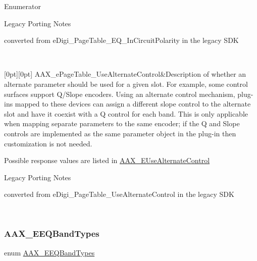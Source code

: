 \begin{DoxyEnumFields}{Enumerator}
\begin{DoxyRefDesc}{Legacy Porting Notes}
\item[\mbox{\hyperlink{a00787__porting_notes000025}{Legacy Porting Notes}}]converted from {\ttfamily e\+Digi\+\_\+\+Page\+Table\+\_\+\+E\+Q\+\_\+\+In\+Circuit\+Polarity} in the legacy S\+DK\end{DoxyRefDesc}
\\
\hline

[0pt][0pt]{}\mbox{\label{a00491_aa169208a2ce713fa021e20deb2eaf608a1a0d975a333d3aee81b22f878697e9c4}} 
A\+A\+X\+\_\+e\+Page\+Table\+\_\+\+Use\+Alternate\+Control&Description of whether an alternate parameter should be used for a given slot. For example, some control surfaces support Q/\+Slope encoders. Using an alternate control mechanism, plug-\/ins mapped to these devices can assign a different slope control to the alternate slot and have it coexist with a Q control for each band. This is only applicable when mapping separate parameters to the same encoder; if the Q and Slope controls are implemented as the same parameter object in the plug-\/in then customization is not needed.

Possible response values are listed in \mbox{\hyperlink{a00491_abbcc8b4e8207262a5dd9e32047a51a29}{A\+A\+X\+\_\+\+E\+Use\+Alternate\+Control}}

\begin{DoxyRefDesc}{Legacy Porting Notes}
\item[\mbox{\hyperlink{a00787__porting_notes000026}{Legacy Porting Notes}}]converted from {\ttfamily e\+Digi\+\_\+\+Page\+Table\+\_\+\+Use\+Alternate\+Control} in the legacy S\+DK\end{DoxyRefDesc}
\\
\hline

\end{DoxyEnumFields}
\mbox{\label{a00491_a9ec6da28e827496514bd15d6f2b26d95}} 
\subsubsection{\texorpdfstring{AAX\_EEQBandTypes}{AAX\_EEQBandTypes}}
{\footnotesize\ttfamily enum \mbox{\hyperlink{a00491_a9ec6da28e827496514bd15d6f2b26d95}{A\+A\+X\+\_\+\+E\+E\+Q\+Band\+Types}}}



